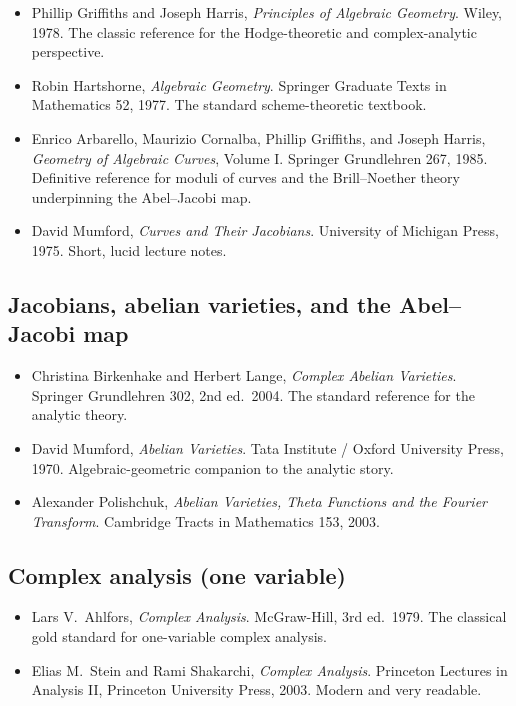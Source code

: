 \begin{itemize}
  \item Phillip Griffiths and Joseph Harris, \emph{Principles of
    Algebraic Geometry}. Wiley, 1978. The classic reference for
    the Hodge-theoretic and complex-analytic perspective.
  \item Robin Hartshorne, \emph{Algebraic Geometry}. Springer
    Graduate Texts in Mathematics 52, 1977. The standard
    scheme-theoretic textbook.
  \item Enrico Arbarello, Maurizio Cornalba, Phillip Griffiths, and
    Joseph Harris, \emph{Geometry of Algebraic Curves}, Volume I.
    Springer Grundlehren 267, 1985. Definitive reference for moduli
    of curves and the Brill--Noether theory underpinning the
    Abel--Jacobi map.
  \item David Mumford, \emph{Curves and Their Jacobians}. University
    of Michigan Press, 1975. Short, lucid lecture notes.
\end{itemize}

\subsection*{Jacobians, abelian varieties, and the Abel--Jacobi map}

\begin{itemize}
  \item Christina Birkenhake and Herbert Lange, \emph{Complex Abelian
    Varieties}. Springer Grundlehren 302, 2nd ed.\ 2004. The
    standard reference for the analytic theory.
  \item David Mumford, \emph{Abelian Varieties}. Tata Institute /
    Oxford University Press, 1970. Algebraic-geometric companion to
    the analytic story.
  \item Alexander Polishchuk, \emph{Abelian Varieties, Theta
    Functions and the Fourier Transform}. Cambridge Tracts in
    Mathematics 153, 2003.
\end{itemize}

\subsection*{Complex analysis (one variable)}

\begin{itemize}
  \item Lars V.\ Ahlfors, \emph{Complex Analysis}. McGraw-Hill,
    3rd ed.\ 1979. The classical gold standard for one-variable
    complex analysis.
  \item Elias M.\ Stein and Rami Shakarchi, \emph{Complex Analysis}.
    Princeton Lectures in Analysis II, Princeton University Press,
    2003. Modern and very readable.
\end{itemize}

